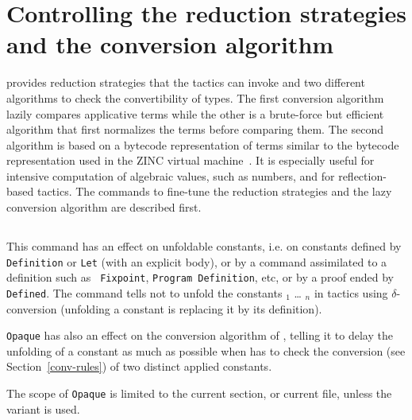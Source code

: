 
\section{Controlling the reduction strategies and the conversion algorithm}
\label{Controlling_reduction_strategy}

{\Coq} provides reduction strategies that the tactics can invoke and
two different algorithms to check the convertibility of types.
The first conversion algorithm lazily
compares applicative terms while the other is a brute-force but efficient
algorithm that first normalizes the terms before comparing them.  The
second algorithm is based on a bytecode representation of terms
similar to the bytecode representation used in the ZINC virtual
machine~\cite{Leroy90}. It is especially useful for intensive
computation of algebraic values, such as numbers, and for reflection-based
tactics. The commands to fine-tune the reduction strategies and the
lazy conversion algorithm are described first.

\subsection[{\tt Opaque} \qualid$_1$ {\ldots} \qualid$_n${\tt .}]{{}\label{Opaque}}
This command has an effect on unfoldable constants, i.e. 
on constants defined by {\tt Definition} or {\tt Let} (with an explicit
body), or by a command assimilated to a definition such as {\tt
Fixpoint}, {\tt Program Definition}, etc, or by a proof ended by {\tt
Defined}. The command tells not to unfold
the constants {\qualid$_1$} {\ldots} {\qualid$_n$} in tactics using
$\delta$-conversion (unfolding a constant is replacing it by its
definition).

{\tt Opaque} has also an effect on the conversion algorithm of {\Coq},
telling it to delay the unfolding of a constant as much as possible when
{\Coq} has to check the conversion (see Section~\ref{conv-rules})
of two distinct applied constants.

The scope of {\tt Opaque} is limited to the current section, or
current file, unless the variant {} is used.

